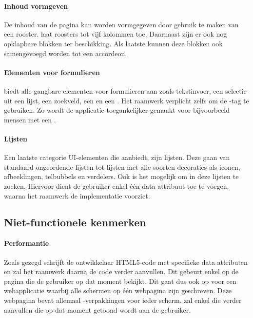 \paragraph{Inhoud vormgeven}
De inhoud van de pagina kan worden vormgegeven door gebruik te maken van een rooster. 
\jqm{} laat roosters tot vijf kolommen toe. 
Daarnaast zijn er ook nog opklapbare blokken ter beschikking. 
Als laatste kunnen deze blokken ook samengevoegd worden tot een accordeon. 

\paragraph{Elementen voor formulieren}
\jqm{} biedt alle gangbare elementen voor formulieren aan zoals tekstinvoer, een selectie uit een lijst, een zoekveld, een  en een . 
Het raamwerk verplicht zelfs om de -tag te gebruiken. 
Zo wordt de applicatie toegankelijker gemaakt voor bijvoorbeeld mensen met een .

\paragraph{Lijsten}
Een laatste categorie UI-elementen die \jqm{} aanbiedt, zijn lijsten. 
Deze gaan van standaard ongeordende lijsten tot lijsten met alle soorten decoraties als iconen, afbeeldingen, telbubbels en verdelers. 
Ook is het mogelijk om in deze lijsten te zoeken. 
Hiervoor dient de gebruiker enkel één data attribuut toe te voegen, waarna het raamwerk de implementatie voorziet. 

\subsection{Niet-functionele kenmerken}
\paragraph{Performantie}
Zoals gezegd schrijft de ontwikkelaar HTML5-code met specifieke data attributen en zal het raamwerk daarna de code verder aanvullen. 
Dit gebeurt enkel op de pagina die de gebruiker op dat moment bekijkt. 
Dit gaat dus ook op voor een webapplicatie waarbij alle schermen op één webpagina zijn geschreven. 
Deze webpagina bevat allemaal -verpakkingen voor ieder scherm. 
\jqm{} zal enkel die  verder aanvullen die op dat moment getoond wordt aan de gebruiker. 


